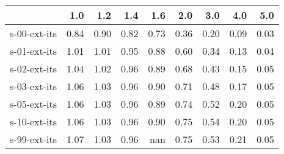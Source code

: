 \begin{tabular}{lrrrrrrrr}
\toprule
{} &  1.0 &  1.2 &  1.4 &  1.6 &  2.0 &  3.0 &  4.0 &  5.0 \\
\midrule
s-00-ext-its & 0.84 & 0.90 & 0.82 & 0.73 & 0.36 & 0.20 & 0.09 & 0.03 \\
s-01-ext-its & 1.01 & 1.01 & 0.95 & 0.88 & 0.60 & 0.34 & 0.13 & 0.04 \\
s-02-ext-its & 1.04 & 1.02 & 0.96 & 0.89 & 0.68 & 0.43 & 0.15 & 0.05 \\
s-03-ext-its & 1.06 & 1.03 & 0.96 & 0.90 & 0.71 & 0.48 & 0.17 & 0.05 \\
s-05-ext-its & 1.06 & 1.03 & 0.96 & 0.89 & 0.74 & 0.52 & 0.20 & 0.05 \\
s-10-ext-its & 1.06 & 1.03 & 0.96 & 0.90 & 0.75 & 0.54 & 0.20 & 0.05 \\
s-99-ext-its & 1.07 & 1.03 & 0.96 &  nan & 0.75 & 0.53 & 0.21 & 0.05 \\
\bottomrule
\end{tabular}
